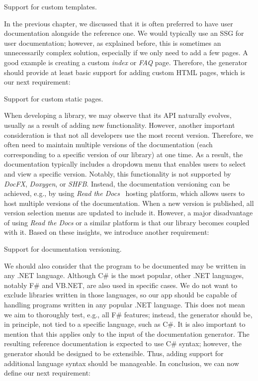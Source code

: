 \begin{requirement}
    Support for custom templates.
    \label{req:templates}
\end{requirement}

In the previous chapter, we discussed that it is often preferred to have user documentation alongside the reference one. 
We would typically use an SSG for user documentation; however, as explained before, this is sometimes an unnecessarily complex solution, especially if we only need to add a few pages.
A good example is creating a custom \textit{index} or \textit{FAQ} page.
Therefore, the generator should provide at least basic support for adding custom HTML pages, which is our next requirement:

\begin{requirement}
    Support for custom static pages.
    \label{req:static-pages}
\end{requirement}

When developing a library, we may observe that its API naturally evolves, usually as a result of adding new functionality.
However, another important consideration is that not all developers use the most recent version.
Therefore, we often need to maintain multiple versions of the documentation (each corresponding to a specific version of our library) at one time.
As a result, the documentation typically includes a dropdown menu that enables users to select and view a specific version.
Notably, this functionality is not supported by \textit{DocFX}, \textit{Doxygen}, or \textit{SHFB}.
Instead, the documentation versioning can be achieved, e.g., by using \textit{Read the Docs}~\cite{read_the_docs} hosting platform, which allows users to host multiple versions of the documentation. 
When a new version is published, all version selection menus are updated to include it.
However, a major disadvantage of using \textit{Read the Docs} or a similar platform is that our library becomes coupled with it.
Based on these insights, we introduce another requirement:

\begin{requirement}
    Support for documentation versioning.
    \label{req:versioning}
\end{requirement}

We should also consider that the program to be documented may be written in any .NET language. 
Although C\# is the most popular, other .NET languages, notably F\# and VB.NET, are also used in specific cases.
We do not want to exclude libraries written in those languages, so our app should be capable of handling programs written in any popular .NET language.
This does not mean we aim to thoroughly test, e.g., all F\# features; instead, the generator should be, in principle, not tied to a specific language, such as C\#.
It is also important to mention that this applies only to the input of the documentation generator.
The resulting reference documentation is expected to use C\# syntax; however, the generator should be designed to be extensible. 
Thus, adding support for additional language syntax should be manageable.
In conclusion, we can now define our next requirement:

